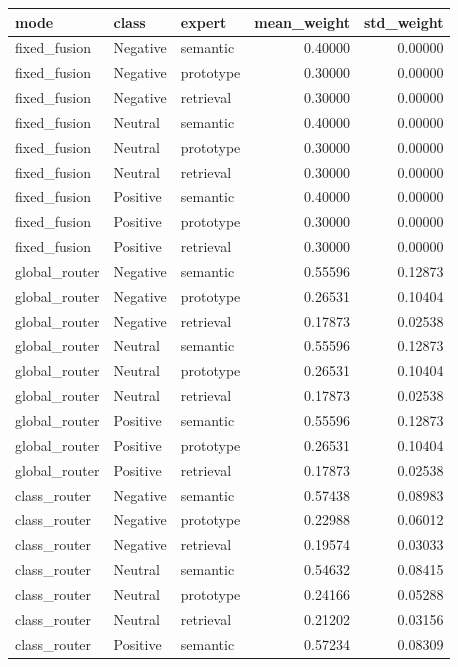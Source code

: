 \begin{tabular}{lllrr}
\toprule
mode & class & expert & mean_weight & std_weight \\
\midrule
fixed_fusion & Negative & semantic & 0.40000 & 0.00000 \\
fixed_fusion & Negative & prototype & 0.30000 & 0.00000 \\
fixed_fusion & Negative & retrieval & 0.30000 & 0.00000 \\
fixed_fusion & Neutral & semantic & 0.40000 & 0.00000 \\
fixed_fusion & Neutral & prototype & 0.30000 & 0.00000 \\
fixed_fusion & Neutral & retrieval & 0.30000 & 0.00000 \\
fixed_fusion & Positive & semantic & 0.40000 & 0.00000 \\
fixed_fusion & Positive & prototype & 0.30000 & 0.00000 \\
fixed_fusion & Positive & retrieval & 0.30000 & 0.00000 \\
global_router & Negative & semantic & 0.55596 & 0.12873 \\
global_router & Negative & prototype & 0.26531 & 0.10404 \\
global_router & Negative & retrieval & 0.17873 & 0.02538 \\
global_router & Neutral & semantic & 0.55596 & 0.12873 \\
global_router & Neutral & prototype & 0.26531 & 0.10404 \\
global_router & Neutral & retrieval & 0.17873 & 0.02538 \\
global_router & Positive & semantic & 0.55596 & 0.12873 \\
global_router & Positive & prototype & 0.26531 & 0.10404 \\
global_router & Positive & retrieval & 0.17873 & 0.02538 \\
class_router & Negative & semantic & 0.57438 & 0.08983 \\
class_router & Negative & prototype & 0.22988 & 0.06012 \\
class_router & Negative & retrieval & 0.19574 & 0.03033 \\
class_router & Neutral & semantic & 0.54632 & 0.08415 \\
class_router & Neutral & prototype & 0.24166 & 0.05288 \\
class_router & Neutral & retrieval & 0.21202 & 0.03156 \\
class_router & Positive & semantic & 0.57234 & 0.08309 \\

\end{tabular}
